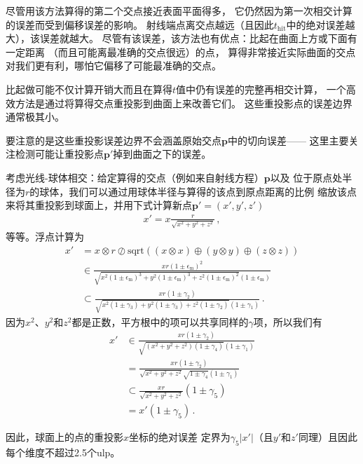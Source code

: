 尽管用该方法算得的第二个交点接近表面平面得多，
它仍然因为第一次相交计算的误差而受到偏移误差的影响。
射线端点离交点越远（且因此$t_{\text{hit}}$中的绝对误差越大），该误差就越大。
尽管有该误差，该方法也有优点：比起在曲面上方或下面有一定距离
（而且可能离最准确的交点很远）的点，
算得非常接近实际曲面的交点对我们更有利，哪怕它偏移了可能最准确的交点。

比起做可能不仅计算开销大而且在算得$t$值中仍有误差的完整再相交计算，
一个高效方法是通过将算得交点重投影到曲面上来改善它们。
这些重投影点的误差边界通常极其小。

要注意的是这些重投影误差边界不会涵盖原始交点$\bm p$中的切向误差——
这里主要关注检测可能让重投影点$\bm p'$掉到曲面之下的误差。

考虑光线-球体相交：给定算得的交点（例如来自射线方程）$\bm p$以及
位于原点处半径为$r$的球体，我们可以通过用球体半径与算得的该点到原点距离的比例
缩放该点来将其重投影到球面上，并用下式计算新点$\bm p'=(x',y',z')$
\begin{align*}
    x'=x\frac{r}{\sqrt{x^2+y^2+z^2}}\, ,
\end{align*}
等等。浮点计算为
\begin{align*}
    x' & =x\otimes r\oslash \text{sqrt}((x\otimes x)\oplus(y\otimes y)\oplus(z\otimes z))                                                                                                \\
       & \in\frac{xr(1\pm\epsilon_{\mathrm{m}})^2}{\sqrt{x^2(1\pm\epsilon_{\mathrm{m}})^3+y^2(1\pm\epsilon_{\mathrm{m}})^3+z^2(1\pm\epsilon_{\mathrm{m}})^2}(1\pm\epsilon_{\mathrm{m}})} \\
       & \subset\frac{xr(1\pm\gamma_2)}{\sqrt{x^2(1\pm\gamma_3)+y^2(1\pm\gamma_3)+z^2(1\pm\gamma_2)}(1\pm\gamma_1)}\, .
\end{align*}
因为$x^2$、$y^2$和$z^2$都是正数，平方根中的项可以共享同样的$\gamma$项，所以我们有
\begin{align}\label{eq:3.14}
    x' & \in\frac{xr(1\pm\gamma_2)}{\sqrt{(x^2+y^2+z^2)(1\pm\gamma_4)}(1\pm\gamma_1)}\nonumber  \\
       & =\frac{xr(1\pm\gamma_2)}{\sqrt{x^2+y^2+z^2}\sqrt{1\pm\gamma_4}(1\pm\gamma_1)}\nonumber \\
       & \subset \frac{xr}{\sqrt{x^2+y^2+z^2}}(1\pm\gamma_5)\nonumber                           \\
       & =x'(1\pm\gamma_5)\, .
\end{align}

因此，球面上的点的重投影$x$坐标的绝对误差
定界为$\gamma_5|x'|$（且$y'$和$z'$同理）且因此每个维度不超过2.5个ulp。

